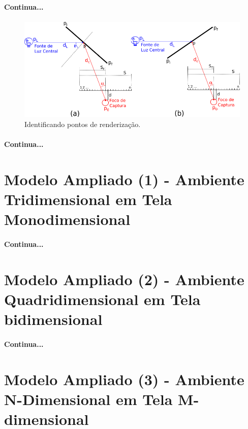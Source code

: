 \documentclass{article}
\begin{document}
	\paragraph{}
	\textbf{Continua...}
	
	\paragraph{}
	\begin{figure}[h]
		\centering
		\includegraphics[scale=0.7]{radiosity-radial}
		\caption{Identificando pontos de renderização.}
		\label{fig:radio-rad}
	\end{figure}

	\paragraph{}
	\textbf{Continua...}

	\section{Modelo Ampliado (1) - Ambiente Tridimensional em Tela Monodimensional}
	
	\paragraph{}
	\textbf{Continua...}
	
	\section{Modelo Ampliado (2) - Ambiente Quadridimensional em Tela bidimensional}
	
	\paragraph{}
	\textbf{Continua...}
	
	\section{Modelo Ampliado (3) - Ambiente N-Dimensional em Tela M-dimensional}
	
\end{document}
